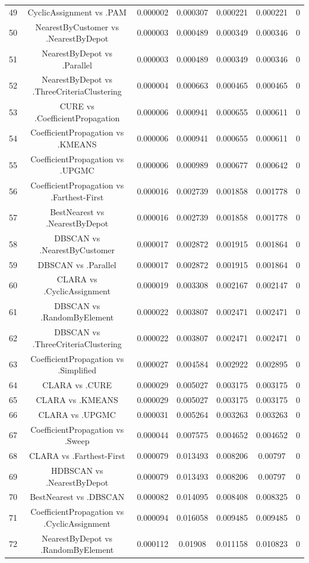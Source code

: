 \documentclass[a4paper,10pt]{article}
\begin{document}
\begin{landscape}
\begin{table}[!htp]
\begin{tabular}{ccccccc}
49&CyclicAssignment vs .PAM&0.000002&0.000307&0.000221&0.000221&0\\
50&NearestByCustomer vs .NearestByDepot&0.000003&0.000489&0.000349&0.000346&0\\
51&NearestByDepot vs .Parallel&0.000003&0.000489&0.000349&0.000346&0\\
52&NearestByDepot vs .ThreeCriteriaClustering&0.000004&0.000663&0.000465&0.000465&0\\
53&CURE vs .CoefficientPropagation&0.000006&0.000941&0.000655&0.000611&0\\
54&CoefficientPropagation vs .KMEANS&0.000006&0.000941&0.000655&0.000611&0\\
55&CoefficientPropagation vs .UPGMC&0.000006&0.000989&0.000677&0.000642&0\\
56&CoefficientPropagation vs .Farthest-First&0.000016&0.002739&0.001858&0.001778&0\\
57&BestNearest vs .NearestByDepot&0.000016&0.002739&0.001858&0.001778&0\\
58&DBSCAN vs .NearestByCustomer&0.000017&0.002872&0.001915&0.001864&0\\
59&DBSCAN vs .Parallel&0.000017&0.002872&0.001915&0.001864&0\\
60&CLARA vs .CyclicAssignment&0.000019&0.003308&0.002167&0.002147&0\\
61&DBSCAN vs .RandomByElement&0.000022&0.003807&0.002471&0.002471&0\\
62&DBSCAN vs .ThreeCriteriaClustering&0.000022&0.003807&0.002471&0.002471&0\\
63&CoefficientPropagation vs .Simplified&0.000027&0.004584&0.002922&0.002895&0\\
64&CLARA vs .CURE&0.000029&0.005027&0.003175&0.003175&0\\
65&CLARA vs .KMEANS&0.000029&0.005027&0.003175&0.003175&0\\
66&CLARA vs .UPGMC&0.000031&0.005264&0.003263&0.003263&0\\
67&CoefficientPropagation vs .Sweep&0.000044&0.007575&0.004652&0.004652&0\\
68&CLARA vs .Farthest-First&0.000079&0.013493&0.008206&0.00797&0\\
69&HDBSCAN vs .NearestByDepot&0.000079&0.013493&0.008206&0.00797&0\\
70&BestNearest vs .DBSCAN&0.000082&0.014095&0.008408&0.008325&0\\
71&CoefficientPropagation vs .CyclicAssignment&0.000094&0.016058&0.009485&0.009485&0\\
72&NearestByDepot vs .RandomByElement&0.000112&0.01908&0.011158&0.010823&0\\

\end{tabular}
\end{table}
\end{landscape}
\end{document}
